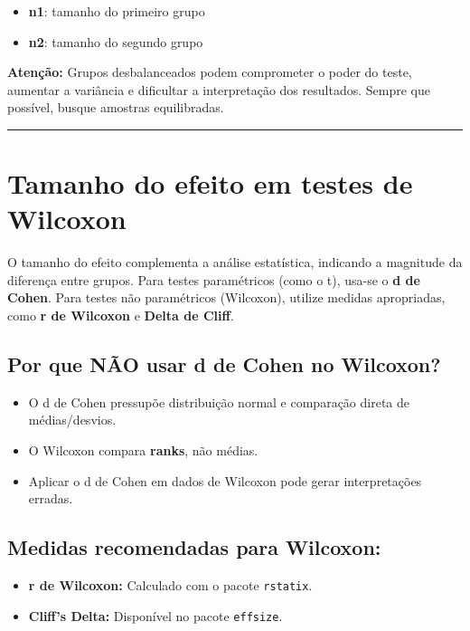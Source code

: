 \documentclass[
]{book}
\providecommand{\tightlist}{%
  \setlength{\itemsep}{0pt}\setlength{\parskip}{0pt}}
\begin{document}
\begin{itemize}
\tightlist
\item
  \textbf{n1}: tamanho do primeiro grupo
\item
  \textbf{n2}: tamanho do segundo grupo
\end{itemize}

\textbf{Atenção:} Grupos desbalanceados podem comprometer o poder do teste, aumentar a variância e dificultar a interpretação dos resultados. Sempre que possível, busque amostras equilibradas.

\begin{center}\rule{0.5\linewidth}{0.5pt}\end{center}

\section{Tamanho do efeito em testes de Wilcoxon}\label{tamanho-do-efeito-em-testes-de-wilcoxon}

O tamanho do efeito complementa a análise estatística, indicando a magnitude da diferença entre grupos. Para testes paramétricos (como o t), usa-se o \textbf{d de Cohen}. Para testes não paramétricos (Wilcoxon), utilize medidas apropriadas, como \textbf{r de Wilcoxon} e \textbf{Delta de Cliff}.

\subsection{Por que NÃO usar d de Cohen no Wilcoxon?}\label{por-que-nuxe3o-usar-d-de-cohen-no-wilcoxon}

\begin{itemize}
\tightlist
\item
  O d de Cohen pressupõe distribuição normal e comparação direta de médias/desvios.
\item
  O Wilcoxon compara \textbf{ranks}, não médias.
\item
  Aplicar o d de Cohen em dados de Wilcoxon pode gerar interpretações erradas.
\end{itemize}

\subsection{Medidas recomendadas para Wilcoxon:}\label{medidas-recomendadas-para-wilcoxon}

\begin{itemize}
\tightlist
\item
  \textbf{r de Wilcoxon:} Calculado com o pacote \texttt{rstatix}.
\item
  \textbf{Cliff's Delta:} Disponível no pacote \texttt{effsize}.
\end{itemize}
\end{document}
